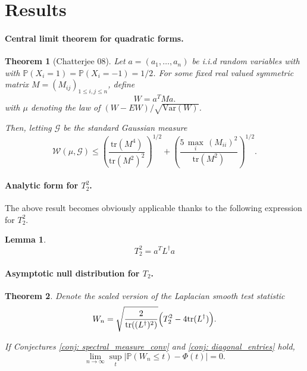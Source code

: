 \documentclass{article}
\newcommand{\Var}[1]{\mathrm{Var}\left( #1 \right)}
\newcommand{\Prob}[1]{\mathbb{P}\left( #1 \right)}
\newcommand{\abs}[1]{\left \lvert #1 \right \rvert}
\newcommand{\Linv}{L^{\dagger}}
\newcommand{\tr}{\text{tr}}
\theoremstyle{alden}
\newtheorem{theorem}{Theorem}
\newtheorem{lemma}{Lemma}
\theoremstyle{definition}
\theoremstyle{remark}
\begin{document}
\section{Results}

\paragraph{Central limit theorem for quadratic forms.}

\begin{theorem}[Chatterjee 08]
	\label{thm: clt_quadratic_forms}
	Let $a = (a_1, \ldots, a_n)$ be i.i.d random variables with with $\Prob{X_i = 1} = \Prob{X_i = -1} = 1/2$. For some fixed real valued symmetric matrix $M = (M_{ij})_{1 \leq i, j \leq n}$, define
	\begin{equation*}
	W = a^T M a.
	\end{equation*}
	with $\mu$ denoting the law of $(W - EW) / \sqrt{\Var{W}}$.
	
	Then, letting $\mathcal{G}$ be the standard Gaussian measure 
	\begin{equation}
	\label{eqn: wass_distance_to_normal}
	\mathcal{W}(\mu, \mathcal{G} ) \leq \left(\frac{\tr(M^4)}{\tr(M^2)^2} \right)^{1/2} + \left( \frac{5 \, \underset{i}{\max} \, (M_{ii})^2}{\tr(M^2)} \right)^{1/2}.
	\end{equation}
\end{theorem}

\paragraph{Analytic form for $T_2^2$.}

The above result becomes obviously applicable thanks to the following expression for $T_2^2$. 

\begin{lemma}
	\label{lemma: T2_analytic_form}
	\begin{equation*}
	T_2^2 = a^T \Linv a  
	\end{equation*}
\end{lemma}

\paragraph{Asymptotic null distribution for $T_2$.}

\begin{theorem}
	\label{thm: asymptotic_null_distribution}
	Denote the scaled version of the Laplacian smooth test statistic
	\begin{equation*}
	W_n = \sqrt{\frac{2}{\tr((\Linv)^2)}}\Bigl(T_2^2 - 4\tr(\Linv) \Bigr).
	\end{equation*}
	
	If Conjectures \ref{conj: spectral_measure_conv} and \ref{conj: diagonal_entries} hold,
	\begin{equation*}
	\lim_{n \to \infty} \sup_{t} \abs{\Prob{W_n \leq t} - \Phi(t)} = 0.
	\end{equation*}
\end{theorem}
\end{document}
